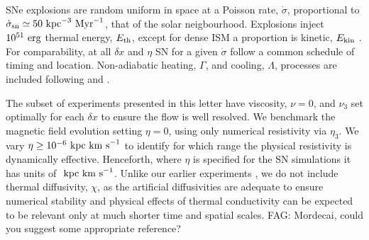 \documentclass[preprint2]{aastex63}
\newcommand\SNr{\dot\sigma_{\rm sn}}
\newcommand\ESK{E_{\rm kin}}
\newcommand\EST{E_{\rm th}}
\newcommand\kpc{~ {\rm kpc}}
\newcommand\dx{ {\delta x}}
\newcommand\Myr{~ {\rm Myr}}
\newcommand\erg{~ {\rm erg}}
\newcommand\kms{~ {\rm km~ s}^{-1}}
\newcommand{\fag}[1]{\textcolor{midgreen}{FAG: #1}}
\begin{document}
 SNe explosions are random uniform in space at a Poisson rate, $\dot\sigma$,
 proportional 
 to $\SNr\simeq 50\kpc^{-3}\Myr^{-1}$, that of the solar neigbourhood.
 Explosions inject $10^{51}\erg$ thermal energy, $\EST$, except for dense ISM
 a proportion is kinetic, $\ESK$ 
 \citep[see][]{GMKSH20}.
 For comparability, at all $\dx$ and $\eta$ SN for a given $\dot\sigma$
 follow a common schedule of timing and location.
 Non-adiabatic heating, $\Gamma$, and cooling, $\Lambda$, processes are
 included \citep{Gent:2013a} following \citet{Wolfire:1995} and
 \citet{Sarazin:1987}.

 The subset of experiments presented in this letter have viscosity, $\nu=0$,
 and $\nu_3$ set optimally for each $\dx$ to ensure the flow is well resolved.
 We benchmark the magnetic field evolution setting $\eta=0$, using only
 numerical resistivity via $\eta_3$.
 We vary $\eta\geq10^{-6}\kpc\kms$ to identify for which range the physical
 resistivity is dynamically effective.
 Henceforth, where $\eta$ is specified for the SN simulations it has units of
 $\kpc\kms$.
 Unlike our earlier experiments \citep{Gent:2013a,Gent:2013b,GMKSH20},
 we do not include thermal diffusivity, $\chi$, as the artificial diffusivities
 are adequate to ensure numerical stability and physical effects of thermal
 conductivity can be expected to be relevant only at much shorter time and
 spatial scales.
\fag{Mordecai, could you suggest some appropriate reference?}
\end{document}
